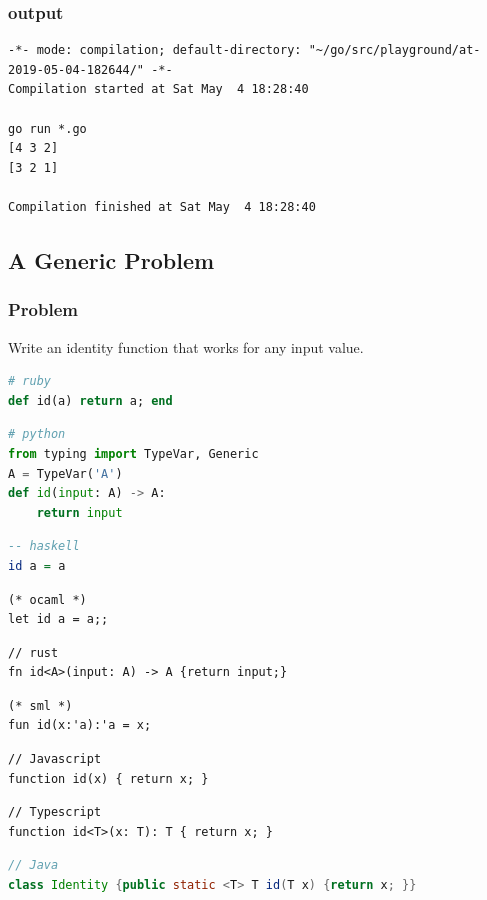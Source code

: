 \documentclass{beamer}
\begin{document}
\begin{frame}[fragile]
  \frametitle{output}
\begin{lstlisting}
-*- mode: compilation; default-directory: "~/go/src/playground/at-2019-05-04-182644/" -*-
Compilation started at Sat May  4 18:28:40

go run *.go
[4 3 2]
[3 2 1]

Compilation finished at Sat May  4 18:28:40
\end{lstlisting}
\end{frame}

\subsection{A Generic Problem}

\begin{frame}
  \frametitle{Problem}
  Write an identity function that works for any input value.
\end{frame}

\begin{frame}[fragile]

\begin{lstlisting}[language=ruby]
# ruby
def id(a) return a; end
\end{lstlisting}
\pause

\begin{lstlisting}[language=python]
# python
from typing import TypeVar, Generic
A = TypeVar('A')
def id(input: A) -> A:
    return input
\end{lstlisting}
\pause

\begin{lstlisting}[language=haskell]
-- haskell
id a = a
\end{lstlisting}
\pause

\begin{lstlisting}
(* ocaml *)
let id a = a;;
\end{lstlisting}
\pause

\begin{lstlisting}
// rust
fn id<A>(input: A) -> A {return input;}
\end{lstlisting}
\pause

\begin{lstlisting}
(* sml *)
fun id(x:'a):'a = x;
\end{lstlisting}
\pause

\begin{lstlisting}
// Javascript
function id(x) { return x; }
\end{lstlisting}
\pause

\begin{lstlisting}
// Typescript
function id<T>(x: T): T { return x; }
\end{lstlisting}
\pause

\begin{lstlisting}[language=Java]
// Java
class Identity {public static <T> T id(T x) {return x; }}
\end{lstlisting}
\end{frame}
\end{document}
